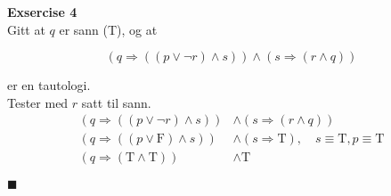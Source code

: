 \documentclass[a4paper, 12pt]{article}  %
\begin{document}
\textbf{Exsercise 4}
\\\newline Gitt at $q$ er sann (T), og at

$$ (q \Rightarrow ((p \lor \neg r) \land s)) \land (s \Rightarrow (r \land q)) $$

er en tautologi.
\\Tester med $r$ satt til sann.
\begin{align*}
    (q \Rightarrow ((p \lor \neg r) \land s))     & \land (s \Rightarrow (r \land q))                                                \\
    (q \Rightarrow ((p \lor \mathrm{F}) \land s)) & \land (s \Rightarrow \mathrm{T}), \quad s \equiv \mathrm{T}, p \equiv \mathrm{T} \\
    (q \Rightarrow (\mathrm{T} \land \mathrm{T})) & \land \mathrm{T}
\end{align*}
\begin{center}
     $\blacksquare$
\end{center}
\end{document}
